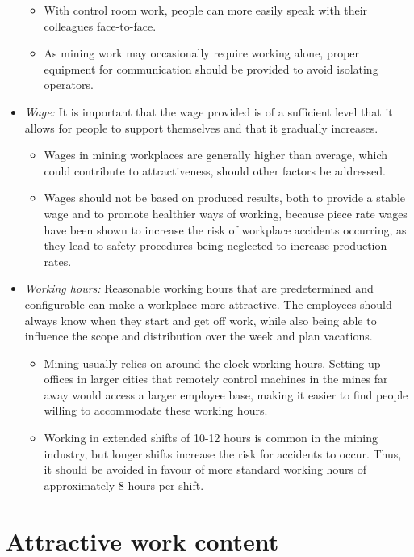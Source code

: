 \documentclass[
  12pt,
]{scrbook}
\begin{document}
\begin{itemize}
  \begin{itemize}
  \item
    With control room work, people can more easily speak with their colleagues face-to-face.
  \item
    As mining work may occasionally require working alone, proper equipment for communication should be provided to avoid isolating operators.
  \end{itemize}
\item
  \emph{Wage:} It is important that the wage provided is of a sufficient level that it allows for people to support themselves and that it gradually increases.

  \begin{itemize}
  \item
    Wages in mining workplaces are generally higher than average, which could contribute to attractiveness, should other factors be addressed.
  \item
    Wages should not be based on produced results, both to provide a stable wage and to promote healthier ways of working, because piece rate wages have been shown to increase the risk of workplace accidents occurring, as they lead to safety procedures being neglected to increase production rates.
  \end{itemize}
\item
  \emph{Working hours:} Reasonable working hours that are predetermined and configurable can make a workplace more attractive. The employees should always know when they start and get off work, while also being able to influence the scope and distribution over the week and plan vacations.

  \begin{itemize}
  \item
    Mining usually relies on around-the-clock working hours. Setting up offices in larger cities that remotely control machines in the mines far away would access a larger employee base, making it easier to find people willing to accommodate these working hours.
  \item
    Working in extended shifts of 10-12 hours is common in the mining industry, but longer shifts increase the risk for accidents to occur. Thus, it should be avoided in favour of more standard working hours of approximately 8 hours per shift.
  \end{itemize}
\end{itemize}

\hypertarget{attractive-work-content}{%
\section*{Attractive work content}\label{attractive-work-content}}
\end{document}
